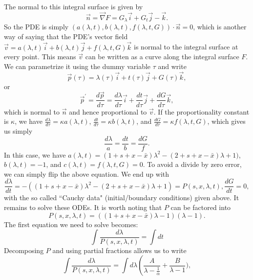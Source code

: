 \documentclass[10pt]{revtex4}
\begin{document}
The normal to this integral surface is given by
\begin{equation}
\vec{n} = \vec{\nabla} F = G_\lambda \vec{i} + G_t \vec{j} - \vec{k}.
\end{equation}
So the PDE is simply $(a(\lambda,t),b(\lambda,t),f(\lambda,t,G)) \cdot \vec{n} = 0$, which is another way of saying that the PDE's vector field $\vec{v} = a(\lambda,t)\vec{i} + b(\lambda,t)\vec{j} + f(\lambda,t,G)\vec{k}$ is normal to the integral surface at every point.
This means $\vec{v}$ can be written as a curve along the integral surface $F$.
We can parametrize it using the dummy variable $\tau$ and write
\begin{equation}
\vec{p}(\tau ) = \lambda(\tau) \vec{i} + t(\tau) \vec{j} + G(\tau ) \vec{k},
\end{equation}
or
\begin{equation}
\vec{p}^\prime = \frac{d\vec{p}}{d\tau} = \frac{d\lambda}{d\tau} \vec{i} + \frac{dt}{d\tau} \vec{j} + \frac{dG}{d\tau} \vec{k},
\end{equation}
which is normal to $\vec{n}$ and hence proportional to $\vec{v}$.
If the proportionality constant is $\kappa$, we have $\frac{d\lambda}{d\tau} = \kappa a(\lambda,t)$, $\frac{dt}{d\tau} = \kappa b(\lambda,t)$, and $\frac{dG}{d\tau} = \kappa f(\lambda,t,G)$, which gives us simply
\begin{equation}
\frac{d\lambda}{a} = \frac{dt}{b} = \frac{dG}{f}.
\end{equation}
In this case, we have $a(\lambda, t) = (1+s+x-\bar{x})\lambda^2 - (2+s+x-\bar{x})\lambda + 1)$, $b(\lambda, t) = -1$, and $c(\lambda, t) = f(\lambda,t,G) = 0$.
To avoid a divide by zero error, we can simply flip the above equation.
We end up with
\begin{equation}
\frac{d\lambda}{dt} = -((1+s+x-\bar{x})\lambda^2 - (2+s+x-\bar{x})\lambda + 1) = P(s,x,\lambda, t), \frac{dG}{dt} = 0,
\end{equation}
with the so called ``Cauchy data" (initial/boundary conditions) given above.
It remains to solve these ODEs.
It is worth noting that $P$ can be factored into
\begin{equation}
P(s,x,\lambda, t) = ((1+s+x-\bar{x})\lambda - 1)(\lambda - 1).
\end{equation}
The first equation we need to solve becomes:
\begin{equation}
\int \frac{d\lambda}{P(s,x,\lambda, t)} = \int dt
\end{equation}
Decomposing $P$ and using partial fractions allows us to write
\begin{equation}
\int \frac{d\lambda}{P(s,x,\lambda, t)} = \int d\lambda\left(\frac{A}{\lambda - \frac{1}{\alpha}} + \frac{B}{\lambda - 1}),
\end{equation}
\end{document}
